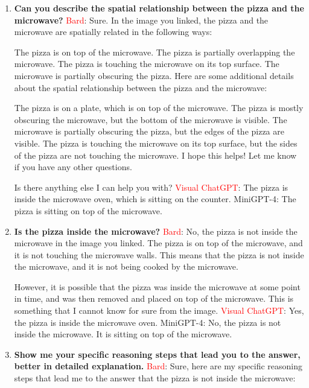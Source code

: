     \begin{enumerate}
        \item \textbf{Can you describe the spatial relationship between the pizza and the microwave?}
        \subitem \textcolor{Red}{Bard}: 
        Sure. In the image you linked, the pizza and the microwave are spatially related in the following ways:
        
        The pizza is on top of the microwave.
        The pizza is partially overlapping the microwave.
        The pizza is touching the microwave on its top surface.
        The microwave is partially obscuring the pizza.
        Here are some additional details about the spatial relationship between the pizza and the microwave:
        
        The pizza is on a plate, which is on top of the microwave.
        The pizza is mostly obscuring the microwave, but the bottom of the microwave is visible.
        The microwave is partially obscuring the pizza, but the edges of the pizza are visible.
        The pizza is touching the microwave on its top surface, but the sides of the pizza are not touching the microwave.
        I hope this helps! Let me know if you have any other questions.
        
        Is there anything else I can help you with?
        \subitem \textcolor{red}{Visual ChatGPT}: The pizza is inside the microwave oven, which is sitting on the counter.
        \subitem MiniGPT-4: The pizza is sitting on top of the microwave.
        \item \textbf{Is the pizza inside the microwave?}
        \subitem \textcolor{Red}{Bard}: 
        No, the pizza is not inside the microwave in the image you linked. The pizza is on top of the microwave, and it is not touching the microwave walls. This means that the pizza is not inside the microwave, and it is not being cooked by the microwave.
        
        However, it is possible that the pizza was inside the microwave at some point in time, and was then removed and placed on top of the microwave. This is something that I cannot know for sure from the image.
        \subitem \textcolor{red}{Visual ChatGPT}: Yes, the pizza is inside the microwave oven.
        \subitem MiniGPT-4: No, the pizza is not inside the microwave. It is sitting on top of the microwave.
        \item \textbf{Show me your specific reasoning steps that lead you to the answer, better in detailed explanation.}
        \subitem \textcolor{Red}{Bard}: 
        Sure, here are my specific reasoning steps that lead me to the answer that the pizza is not inside the microwave:
        

\end{enumerate}
